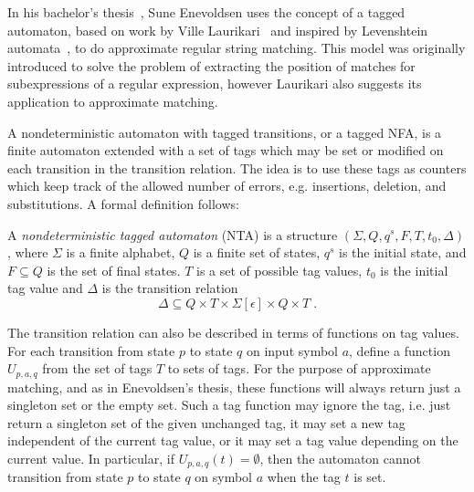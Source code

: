 In his bachelor's thesis~\cite{enevoldsen2015pattern}, Sune Enevoldsen uses the
concept of a tagged automaton, based on work by Ville
Laurikari~\cite{laurikari2000nfas, laurikari2001efficient} and inspired by
Levenshtein automata~\cite{schulz2002fast}, to do approximate regular string
matching. This model was originally introduced to solve the problem of
extracting the position of matches for subexpressions of a regular expression,
however Laurikari also suggests its application to approximate matching.

A nondeterministic automaton with tagged transitions, or a tagged NFA, is a
finite automaton extended with a set of tags which may be set or modified on
each transition in the transition relation. The idea is to use these tags as
counters which keep track of the allowed number of errors, e.g. insertions,
deletion, and substitutions. A formal definition follows:


\begin{definition}[NTA]
  A \emph{nondeterministic tagged automaton} (NTA) is a structure
  $(\Sigma, Q, q^s, F, T, t_0, \Delta)$, where $\Sigma$ is a finite alphabet,
  $Q$ is a finite set of states, $q^s$ is the initial state, and
  $F \subseteq Q$ is the set of final states. $T$ is a set of possible tag
  values, $t_0$ is the initial tag value and $\Delta$ is the transition
  relation
  \[
    \Delta \subseteq Q \times T \times \Sigma[\epsilon] \times Q \times T \;.
  \]
\end{definition}

The transition relation can also be described in terms of functions on tag
values. For each transition from state $p$ to state $q$ on input symbol $a$,
define a function $U_{p,a,q}$ from the set of tags $T$ to sets of tags. For the
purpose of approximate matching, and as in Enevoldsen's thesis, these functions
will always return just a singleton set or the empty set. Such a tag function
may ignore the tag, i.e. just return a singleton set of the given unchanged
tag, it may set a new tag independent of the current tag value, or it may set a
tag value depending on the current value. In particular, if
$U_{p,a,q}(t) = \emptyset$, then the automaton cannot transition from state $p$
to state $q$ on symbol $a$ when the tag $t$ is set.

